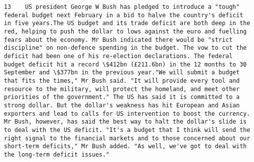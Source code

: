 \documentclass[11pt]{article}
\begin{document}
\begin{Verbatim}[commandchars=\\\{\}]
         13    US president George W Bush has pledged to introduce a "tough" federal budget next February in a bid to halve the country's deficit in five years.The US budget and its trade deficit are both deep in the red, helping to push the dollar to lows against the euro and fuelling fears about the economy. Mr Bush indicated there would be "strict discipline" on non-defence spending in the budget. The vow to cut the deficit had been one of his re-election declarations. The federal budget deficit hit a record \$412bn (£211.6bn) in the 12 months to 30 September and \$377bn in the previous year."We will submit a budget that fits the times," Mr Bush said. "It will provide every tool and resource to the military, will protect the homeland, and meet other priorities of the government." The US has said it is committed to a strong dollar. But the dollar's weakness has hit European and Asian exporters and lead to calls for US intervention to boost the currency. Mr Bush, however, has said the best way to halt the dollar's slide is to deal with the US deficit. "It's a budget that I think will send the right signal to the financial markets and to those concerned about our short-term deficits," Mr Bush added. "As well, we've got to deal with the long-term deficit issues."                                                                                                                                                                                                                                                                                                                                                                                                                                                                                                                                                                                                                                                                                                                                                                                                                                                                                                                                                                                                                                                                                                                                                                                                                                                                                                                                                                                                                                                                                                                                                                                                                                                                                                                                                                                                                                                                                                                                                                                                                                                                                                
\end{Verbatim}
\end{document}
